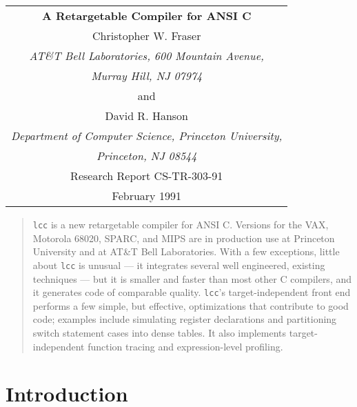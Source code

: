 
\begin{titlepage}
\normalsize
\vspace*{.7in}
\begin{center}
\begin{tabular}{c}
\bf\Large A Retargetable Compiler for ANSI C \\[.5in]

Christopher W. Fraser \\
\em AT\&T Bell Laboratories, 600 Mountain Avenue, \\
\em Murray Hill, NJ 07974 \\[1ex]
and \\[1ex]
David R. Hanson \\
\em Department of Computer Science, Princeton University, \\
\em Princeton, NJ 08544 \\[.7in]

Research Report CS-TR-303-91 \\[1ex]
February 1991 \\[.5in]

\end{tabular}
\end{center}

\begin{abstract}
\normalsize
\verb|lcc| is a new retargetable compiler for ANSI C.
Versions for the VAX, Motorola 68020, SPARC, and MIPS
are in production use at Princeton University
and at AT\&T Bell Laboratories.
With a few exceptions,
little about \verb|lcc| is unusual --- it integrates
several well engineered, existing techniques ---
but it is smaller and faster than most other C compilers,
and it generates code of comparable quality.
\verb|lcc|'s target-independent front end performs a
few simple, but effective, optimizations that contribute
to good code; examples include simulating register declarations
and partitioning switch statement cases into dense tables.
It also implements target-independent function tracing
and expression-level profiling.
\end{abstract}

\end{titlepage}


%

\setcounter{secnumdepth}{0}

\section{Introduction}


